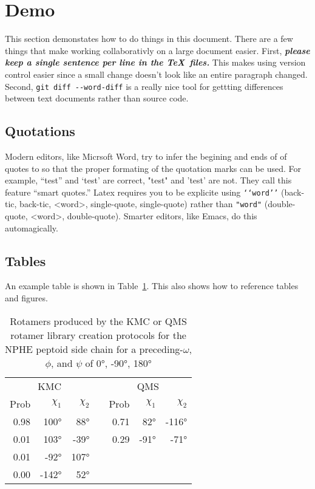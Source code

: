 \section{Demo}
This section demonstates how to do things in this document.
There are a few things that make working collaborativly on a large document easier. 
First, \textit{\textbf{please keep a single sentence per line in the \TeX\ files.}}
This makes using version control easier since a small change doesn't look like an entire paragraph changed.
Second, \texttt{git diff -{}-word-diff} is a really nice tool for gettting differences between text documents rather than source code.

\subsection{Quotations}
Modern editors, like Micrsoft Word, try to infer the begining and ends of of quotes to so that the proper formating of the quotation marks can be used. For example, ``test'' and `test' are correct, "test" and 'test' are not.
They call this feature ``smart quotes.''
Latex requires you to be explicite using \texttt{`{}`word'{}'} (back-tic, back-tic, <word>, single-quote, single-quote) rather than \texttt{"word"} (double-quote, <word>, double-quote).
Smarter editors, like Emacs, do this automagically.


\subsection{Tables}
An example table is shown in Table~\ref{supptbl:rot_lib_snpshot_nmeo}.
This also shows how to reference tables and figures.

\begin{table}
  \centering
  \caption{Rotamers produced by the KMC or QMS rotamer library creation protocols for the NPHE peptoid side chain for a preceding-$\omega$, $\phi$, and $\psi$ of \ang{0}, \ang{-90}, \ang{180}}
  \label{supptbl:rot_lib_snpshot_nmeo}
  \begin{tabular}{rrrcrrr}
    \toprule
    \multicolumn{3}{c}{KMC} && \multicolumn{3}{c}{QMS} \\
    \cmidrule{1-3} \cmidrule{5-7}
    Prob & $\chi_1$  & $\chi_2$ && Prob & $\chi_1$  & $\chi_2$ \\
    \midrule
    0.98 & \ang{100}  &  \ang{88}  && 0.71 & \ang{82}  &  \ang{-116} \\
    0.01 & \ang{103}  &  \ang{-39} && 0.29 & \ang{-91} &  \ang{-71}  \\
    0.01 & \ang{-92}  &  \ang{107} && ~ & ~ & ~ \\
    0.00 & \ang{-142} &  \ang{52}  && ~ & ~ & ~ \\
    \bottomrule
  \end{tabular}
\end{table}


